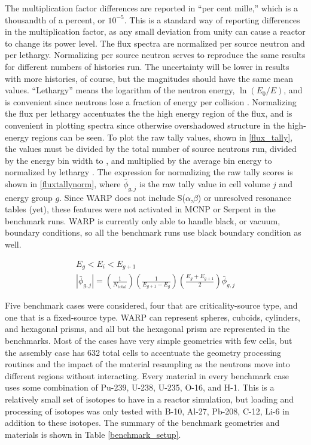 The multiplication factor differences are reported in ``per cent mille,'' which is a thousandth of a percent, or $10^{-5}$.  This is a standard way of reporting differences in the multiplication factor, as any small deviation from unity can cause a reactor to change its power level.  The flux spectra are normalized per source neutron and per lethargy.  Normalizing per source neutron serves to reproduce the same results for different numbers of histories run.  The uncertainty will be lower in results with more histories, of course, but the magnitudes should have the same mean values.   ``Lethargy'' means the logarithm of the neutron energy, $\ln(E_0/E)$, and is convenient since neutrons lose a fraction of energy per collision \cite{duderstadt}.  Normalizing the flux per lethargy accentuates the the high energy region of the flux, and is convenient in plotting spectra since otherwise overshadowed structure in the high-energy regions can be seen.  To plot the raw tally values, shown in \eqref{flux_tally}, the values must be divided by the total number of source neutrons run, divided by the energy bin width to , and multiplied by the average bin energy to normalized by lethargy \cite{lethargyplot}.  The expression for normalizing the raw tally scores is shown in \eqref{fluxtallynorm}, where $\bar{\phi}_{g,j}$ is the raw tally value in cell volume $j$ and energy group $g$.  Since WARP does not include S($\alpha$,$\beta$) or unresolved resonance tables (yet), these features were not activated in MCNP or Serpent in the benchmark runs.  WARP is currently only able to handle black, or vacuum, boundary conditions, so all the benchmark runs use black boundary condition as well.

\begin{equation}
\label{fluxtallynorm}
\begin{gathered}
E_g < E_i < E_{g+1} \\
|\bar{\phi}_{g,j}| = \left( \frac{1}{N_\mathrm{total}}\right) \left(\frac{1}{E_{g+1}-E_g}\right) \left(\frac{E_g+E_{g+1}}{2} \right) \bar{\phi}_{g,j}
\end{gathered}
\end{equation}

Five benchmark cases were considered, four that are criticality-source type, and one that is a fixed-source type.  WARP can represent spheres, cuboids, cylinders, and hexagonal prisms, and all but the hexagonal prism are represented in the benchmarks.  Most of the cases have very simple geometries with few cells, but the assembly case has 632 total cells to accentuate the geometry processing routines and the impact of the material resampling as the neutrons move into different regions without interacting.  Every material in every benchmark case uses some combination of Pu-239, U-238, U-235, O-16, and H-1.  This is a relatively small set of isotopes to have in a reactor simulation, but loading and processing of isotopes was only tested with B-10, Al-27, Pb-208, C-12, Li-6 in addition to these isotopes.   The summary of the benchmark geometries and materials is shown in Table \ref{benchmark_setup}.  


